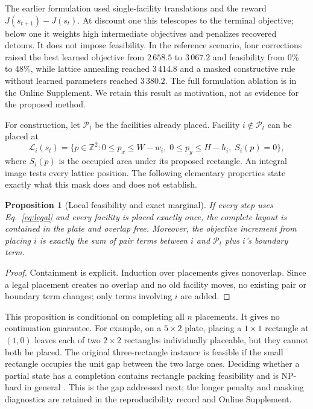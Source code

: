 \documentclass[preprint,12pt,authoryear]{elsarticle}
\newtheorem{prop}{Proposition}
\newcommand{\Z}{\mathbb{Z}}
\newcommand{\cL}{\mathcal{L}}
\newcommand{\cP}{\mathcal{P}}
\begin{document}
The earlier formulation used single-facility translations and the reward
$J(s_{t+1})-J(s_t)$. At discount one this telescopes to the terminal objective;
below one it weights high intermediate objectives and penalizes recovered
detours. It does not impose feasibility. In the reference scenario, four
corrections raised the best learned objective from $2\,658.5$ to $3\,067.2$ and
feasibility from 0\% to 48\%, while lattice annealing reached $3\,414.8$ and a
masked constructive rule without learned parameters reached $3\,380.2$. The
full formulation ablation is in the Online Supplement. We retain this result as
motivation, not as evidence for the proposed method.

For construction, let $\cP_t$ be the facilities already placed. Facility
$i\notin\cP_t$ can be placed at
\begin{equation}
\cL_i(s_t)=\{p\in\Z^2:0\le p_x\le W-w_i,\;0\le p_y\le H-h_i,\;S_i(p)=0\},
\label{eq:legal}
\end{equation}
where $S_i(p)$ is the occupied area under its proposed rectangle. An integral
image tests every lattice position. The following elementary properties state
exactly what this mask does and does not establish.

\begin{prop}[Local feasibility and exact marginal]
\label{prop:invariant}
\label{prop:marginal}
If every step uses Eq.~\eqref{eq:legal} and every facility is placed exactly
once, the complete layout is contained in the plate and overlap free. Moreover,
the objective increment from placing $i$ is exactly the sum of pair terms
between $i$ and $\cP_t$ plus $i$'s boundary term.
\end{prop}
\begin{proof}
Containment is explicit. Induction over placements gives nonoverlap. Since a
legal placement creates no overlap and no old facility moves, no existing pair
or boundary term changes; only terms involving $i$ are added.
\end{proof}

This proposition is conditional on completing all $n$ placements. It gives no
continuation guarantee. For example, on a $5\times2$ plate, placing a $1\times1$
rectangle at $(1,0)$ leaves each of two $2\times2$ rectangles individually
placeable, but they cannot both be placed. The original three-rectangle instance
is feasible if the small rectangle occupies the unit gap between the two large
ones. Deciding whether a partial state has a completion contains rectangle
packing feasibility and is NP-hard in general \citep{Fowler1981Packing}. This is
the gap addressed next; the longer penalty and masking diagnostics are retained
in the reproducibility record and Online Supplement.
\end{document}
